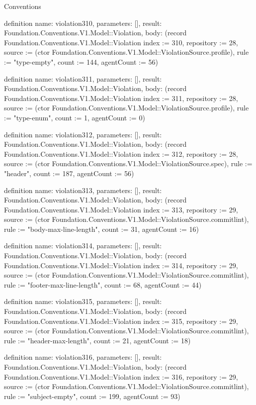 \begin{lexlean}{Conventions}
\begin{semanticmodule}
definition{
  name: violation310,
  parameters: [],
  result: Foundation.Conventions.V1.Model::Violation,
  body: (record Foundation.Conventions.V1.Model::Violation {index := 310, repository := 28, source := (ctor Foundation.Conventions.V1.Model::ViolationSource.profile), rule := "type-empty", count := 144, agentCount := 56})
}

definition{
  name: violation311,
  parameters: [],
  result: Foundation.Conventions.V1.Model::Violation,
  body: (record Foundation.Conventions.V1.Model::Violation {index := 311, repository := 28, source := (ctor Foundation.Conventions.V1.Model::ViolationSource.profile), rule := "type-enum", count := 1, agentCount := 0})
}

definition{
  name: violation312,
  parameters: [],
  result: Foundation.Conventions.V1.Model::Violation,
  body: (record Foundation.Conventions.V1.Model::Violation {index := 312, repository := 28, source := (ctor Foundation.Conventions.V1.Model::ViolationSource.spec), rule := "header", count := 187, agentCount := 56})
}

definition{
  name: violation313,
  parameters: [],
  result: Foundation.Conventions.V1.Model::Violation,
  body: (record Foundation.Conventions.V1.Model::Violation {index := 313, repository := 29, source := (ctor Foundation.Conventions.V1.Model::ViolationSource.commitlint), rule := "body-max-line-length", count := 31, agentCount := 16})
}

definition{
  name: violation314,
  parameters: [],
  result: Foundation.Conventions.V1.Model::Violation,
  body: (record Foundation.Conventions.V1.Model::Violation {index := 314, repository := 29, source := (ctor Foundation.Conventions.V1.Model::ViolationSource.commitlint), rule := "footer-max-line-length", count := 68, agentCount := 44})
}

definition{
  name: violation315,
  parameters: [],
  result: Foundation.Conventions.V1.Model::Violation,
  body: (record Foundation.Conventions.V1.Model::Violation {index := 315, repository := 29, source := (ctor Foundation.Conventions.V1.Model::ViolationSource.commitlint), rule := "header-max-length", count := 21, agentCount := 18})
}

definition{
  name: violation316,
  parameters: [],
  result: Foundation.Conventions.V1.Model::Violation,
  body: (record Foundation.Conventions.V1.Model::Violation {index := 316, repository := 29, source := (ctor Foundation.Conventions.V1.Model::ViolationSource.commitlint), rule := "subject-empty", count := 199, agentCount := 93})
}


\end{semanticmodule}
\end{lexlean}
